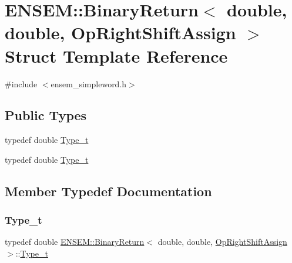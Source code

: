 \hypertarget{structENSEM_1_1BinaryReturn_3_01double_00_01double_00_01OpRightShiftAssign_01_4}{}\section{E\+N\+S\+EM\+:\+:Binary\+Return$<$ double, double, Op\+Right\+Shift\+Assign $>$ Struct Template Reference}
\label{structENSEM_1_1BinaryReturn_3_01double_00_01double_00_01OpRightShiftAssign_01_4}


{\ttfamily \#include $<$ensem\+\_\+simpleword.\+h$>$}

\subsection*{Public Types}
\begin{DoxyCompactItemize}
\item 
typedef double \mbox{\hyperlink{structENSEM_1_1BinaryReturn_3_01double_00_01double_00_01OpRightShiftAssign_01_4_a4a608032925ea3919409492676f39f69}{Type\+\_\+t}}
\item 
typedef double \mbox{\hyperlink{structENSEM_1_1BinaryReturn_3_01double_00_01double_00_01OpRightShiftAssign_01_4_a4a608032925ea3919409492676f39f69}{Type\+\_\+t}}
\end{DoxyCompactItemize}


\subsection{Member Typedef Documentation}
\mbox{\label{structENSEM_1_1BinaryReturn_3_01double_00_01double_00_01OpRightShiftAssign_01_4_a4a608032925ea3919409492676f39f69}} 
\subsubsection{\texorpdfstring{Type\_t}{Type\_t}\hspace{0.1cm}{\footnotesize\ttfamily [1/2]}}
{\footnotesize\ttfamily typedef double \mbox{\hyperlink{structENSEM_1_1BinaryReturn}{E\+N\+S\+E\+M\+::\+Binary\+Return}}$<$ double, double, \mbox{\hyperlink{structENSEM_1_1OpRightShiftAssign}{Op\+Right\+Shift\+Assign}} $>$\+::\mbox{\hyperlink{structENSEM_1_1BinaryReturn_3_01double_00_01double_00_01OpRightShiftAssign_01_4_a4a608032925ea3919409492676f39f69}{Type\+\_\+t}}}

